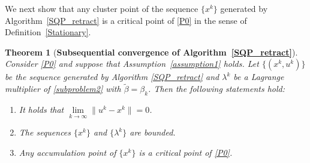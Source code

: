 \documentclass[10pt]{article}
\numberwithin{equation}{section}
\newtheorem{theorem}{Theorem}[section]
\begin{document}
We next show that any cluster point of the sequence $\{x^k\}$ generated by Algorithm~\ref{SQP_retract} is a critical point of \eqref{P0} in the sense of Definition~\ref{Stationary}.
\begin{theorem}[{{\bf Subsequential convergence of Algorithm~\ref{SQP_retract}}}]\label{convergence2}
Consider \eqref{P0} and suppose that Assumption~\ref{assumption1} holds. Let $\{(x^k, u^k)\}$ be the sequence generated by Algorithm \ref{SQP_retract} and $\lambda^k$ be a Lagrange multiplier of \eqref{subproblem2} with $\widetilde{\beta} = \beta_k$. Then the following statements hold:
\begin{enumerate}[{\rm(i)}]
  \item It holds that $\lim\limits_{k\rightarrow\infty}\|u^k - x^k\| = 0$.
  \item The sequences $\{x^k\}$ and $\{\lambda^k\}$ are bounded.
  \item Any accumulation point of $\{x^k\}$ is a critical point of \eqref{P0}.
\end{enumerate}
\end{theorem}
\end{document}
